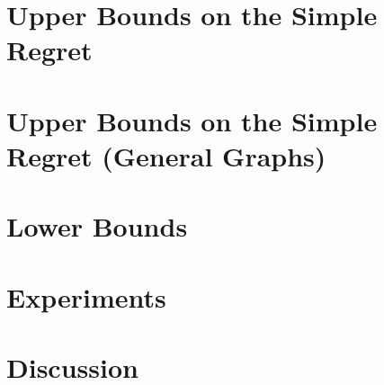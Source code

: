 \documentclass{article}
\theoremstyle{plain}
\theoremstyle{definition}
\begin{document}
\section{Upper Bounds on the Simple Regret}
\label{sec:simple-regret}

%

\section{Upper Bounds on the Simple Regret (General Graphs)}
\label{sec:simple-regret-general}



 



%


\section{Lower Bounds}




\section{Experiments}

%

\section{Discussion}





\end{document}
